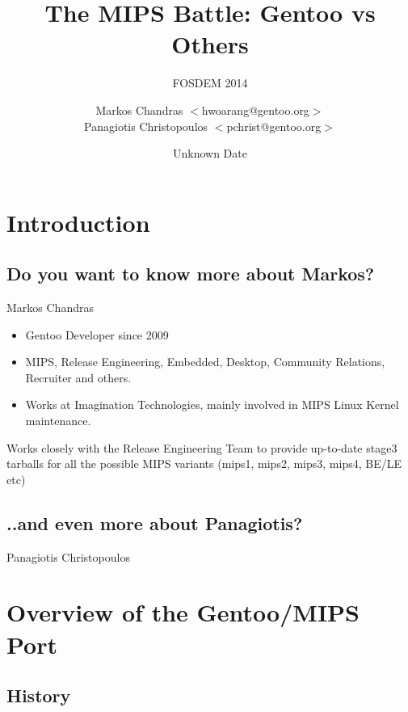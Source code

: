 \documentclass{beamer}
\title{The MIPS Battle: Gentoo vs Others}
\subtitle{FOSDEM 2014}
\author[Markos Chandras \& Panagiotis Christopoulos]{Markos Chandras $<$hwoarang@gentoo.org$>$ \\ Panagiotis Christopoulos $<$pchrist@gentoo.org$>$}
\date{Unknown Date}
\begin{document}
\frame{\titlepage}

\section{Introduction}

\subsection{Do you want to know more about Markos?}

\begin{frame}{Markos Chandras}
	\begin{itemize}
		\item Gentoo Developer since 2009
		\item MIPS, Release Engineering, Embedded, Desktop, Community Relations, Recruiter and others.
		\item Works at Imagination Technologies, mainly involved in MIPS Linux Kernel maintenance.
	\end{itemize}
	Works closely with the Release Engineering Team to provide up-to-date stage3 tarballs for all the possible MIPS variants (mips1, mips2, mips3, mips4, BE/LE etc)
\end{frame}

\subsection{..and even more about Panagiotis?}
\begin{frame}{Panagiotis Christopoulos}
\end{frame}

\section{Overview of the Gentoo/MIPS Port}

\subsection{History}
\end{document}
